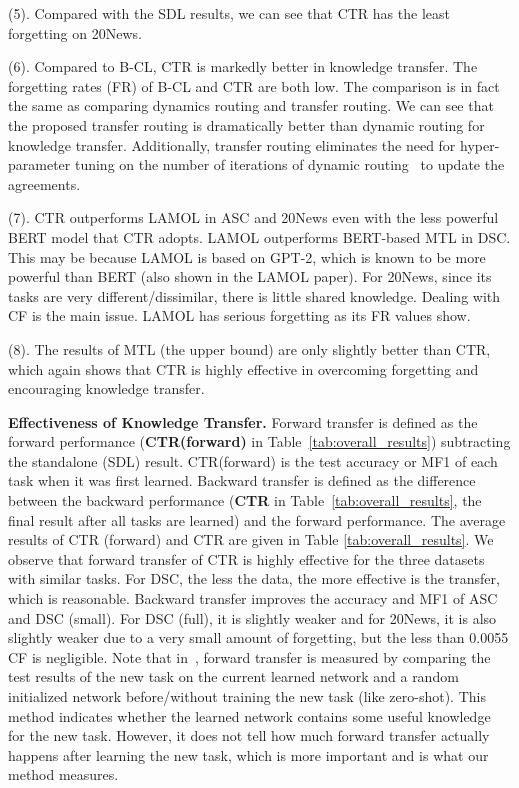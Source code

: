 \documentclass{article}
\begin{document}
(5). Compared with the SDL results, we can see that CTR has the least forgetting on 20News. 

{\color{black}(6). Compared to B-CL, CTR is markedly better in knowledge transfer. The forgetting rates (FR) of B-CL and CTR are both low. {\color{black}The comparison is in fact the same as comparing dynamics routing and transfer routing. We can see that the proposed transfer routing is dramatically better than dynamic routing for knowledge transfer. Additionally, transfer routing eliminates the need for hyper-parameter tuning on the number of iterations of dynamic routing~\cite{sabour2017dynamic} to update the agreements.} 



(7). CTR outperforms LAMOL in ASC and 20News even with the less powerful BERT model that CTR adopts. LAMOL outperforms BERT-based MTL in DSC. This may be because LAMOL is based on GPT-2, which is known to be more powerful than BERT (also shown in the LAMOL paper). For 20News, since its tasks are very different/dissimilar, there is little shared knowledge. Dealing with CF is the main issue. LAMOL has serious forgetting as its FR values show. 

(8). The results of MTL (the upper bound) are only slightly better than CTR, which again shows that CTR is highly effective in overcoming forgetting and encouraging knowledge transfer. }






\textbf{Effectiveness of Knowledge Transfer.}
{\color{black}Forward transfer is defined as the forward performance (\textbf{CTR(forward)} in Table~\ref{tab:overall_results}) subtracting the standalone (SDL) result. CTR(forward) is the test accuracy or MF1 of each task when it was first learned. Backward transfer is defined as the difference between the backward performance (\textbf{CTR} in Table~\ref{tab:overall_results}, the final result after all tasks are learned) and the forward performance.  {The average results of CTR (forward) and {CTR} are given in Table \ref{tab:overall_results}. We observe that forward transfer of CTR is highly effective for the three datasets with similar tasks. For DSC, the less the data, the more effective is the transfer, which is reasonable.} 
{Backward transfer improves the accuracy and MF1 of ASC and DSC (small). For DSC (full), it is slightly weaker and for 20News, it is also slightly weaker due to a very small amount of forgetting}, but the less than 0.0055 CF is negligible. {\color{black} Note that in~\cite{Lopez2017gradient,riemer2018learning}, forward transfer is measured by comparing the test results of the new task on the current learned network and a random initialized network before/without training the new task (like zero-shot). This method indicates whether the learned network contains some useful knowledge for the new task. However, it does not tell how much forward transfer actually happens after learning the new task, which is more important and is what our method measures. }}
\end{document}

